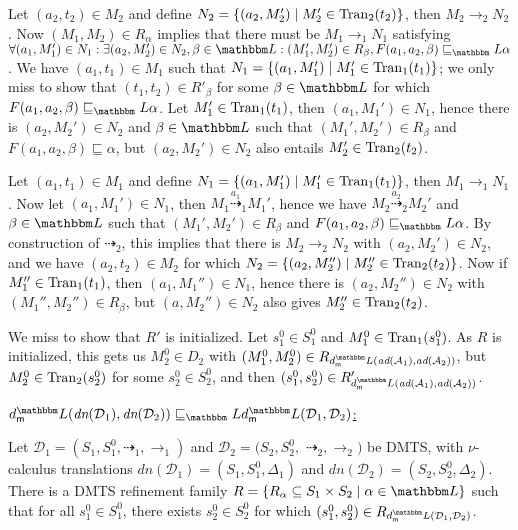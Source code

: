 \documentclass[twocolumn]{svjour3-dummy}
\newcommand*{\must}[1]{\overset{#1}{\longrightarrow}}
\newcommand*{\omust}{\mathord{\must{}}}
\newcommand*\cD{\mathcal D}
\newcommand*{\may}[1]{\overset{#1}{\dashrightarrow}}
\newcommand*{\omay}{\mathord{\may{}}}
\newcommand*\cA{\mathcal A}
\newcommand*\Tran{\textup{\textrm{Tran}}}
\newcommand*\ddh{\textit{dn}} \newcommand*\hd{\textit{nd}} \newcommand*\viz{\textit{viz.}\xspace}
\newcommand*\LL{\mathbbm L}
\begin{document}
  Let $( a_2, t_2)\in M_2$ and define $N_2=\{( a_2, M_2')\mid M_2'\in
  \Tran_2( t_2)\}$, then $M_2\must{}_2 N_2$.  Now $( M_1, M_2)\in
  R_\alpha$ implies that there must be $M_1\must{}_1 N_1$ satisfying
  $\forall( a_1, M_1')\in N_1: \exists( a_2, M_2')\in N_2, \beta\in
  \LL:( M_1', M_2')\in R_\beta, F( a_1, a_2, \beta)\sqsubseteq_\LL
  \alpha$.  We have $( a_1, t_1)\in M_1$ such that $N_1=\{( a_1,
  M_1')\mid M_1'\in \Tran_1( t_1)\}$; we only miss to show that $( t_1,
  t_2)\in R'_\beta$ for some $\beta\in \LL$ for which $F( a_1, a_2,
  \beta)\sqsubseteq_\LL \alpha$.  Let $M_1'\in \Tran_1( t_1)$, then $(
  a_1, M_1')\in N_1$, hence there is $( a_2, M_2')\in N_2$ and $\beta\in
  \LL$ such that $( M_1', M_2')\in R_\beta$ and $F( a_1, a_2,
  \beta)\sqsubseteq \alpha$, but $( a_2, M_2')\in N_2$ also entails
  $M_2'\in \Tran_2( t_2)$.

  Let $( a_1, t_1)\in M_1$ and define $N_1=\{( a_1, M_1')\mid M_1'\in
  \Tran_1( t_1)\}$, then $M_1\must{}_1 N_1$.  Now let $( a_1, M_1')\in
  N_1$, then $M_1\may{ a_1}_1 M_1'$, hence we have $M_2\may{ a_2}_2
  M_2'$ and $\beta\in \LL$ such that $( M_1', M_2')\in R_\beta$ and $F(
  a_1, a_2, \beta)\sqsubseteq_\LL \alpha$.  By construction of
  $\omay_2$, this implies that there is $M_2\must{}_2 N_2$ with $( a_2,
  M_2')\in N_2$, and we have $( a_2, t_2)\in M_2$ for which $N_2=\{(
  a_2, M_2'')\mid M_2''\in \Tran_2( t_2)\}$.  Now if $M_1''\in \Tran_1(
  t_1)$, then $( a_1, M_1'')\in N_1$, hence there is $( a_2, M_2'')\in
  N_2$ with $( M_1'', M_2'')\in R_\beta$, but $( a, M_2'')\in N_2$ also
  gives $M_2''\in \Tran_2( t_2)$.

  We miss to show that $R'$ is initialized.  Let $s^0_1\in S^0_1$ and
  $M^0_1\in \Tran_1( s^0_1)$.  As $R$ is initialized, this gets us
  $M^0_2\in D_2$ with $( M^0_1, M^0_2)\in R_{ \mdl( \bd( \cA_1), \bd(
    \cA_2))}$, but $M^0_2\in \Tran_2( s^0_2)$ for some $s^0_2\in S^0_2$,
  and then $( s^0_1, s^0_2)\in R'_{ \mdl( \bd( \cA_1), \bd( \cA_2))}$.

  \medskip \noindent \underline{$\mdl( \ddh( \cD_1), \ddh(
    \cD_2))\sqsubseteq_\LL \mdl( \cD_1, \cD_2)$:}

  Let $\cD_1=( S_1, S_1^0, \omay_1, \omust_1)$ and
  $\cD_2=( S_2, S_2^0,$ $\omay_2, \omust_2)$ be DMTS, with
  $\nu$-calculus translations $\ddh( \cD_1)=( S_1, S_1^0, \Delta_1)$
  and $\ddh( \cD_2)=( S_2, S_2^0, \Delta_2)$.  There is a DMTS
  refinement family
  $R=\{ R_\alpha\subseteq S_1\times S_2\mid \alpha\in \LL\}$ such that
  for all $s_1^0\in S_1^0$, there exists $s_2^0\in S_2^0$ for which
  $( s_1^0, s_2^0)\in R_{ \mdl( \cD_1, \cD_2)}$.
\end{document}
